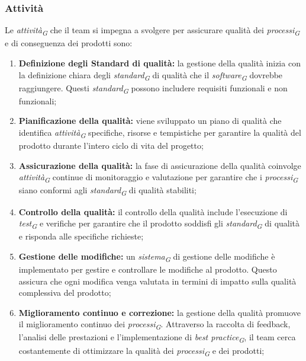 \subsubsection{Attività}
Le \textit{attività}\textsubscript{\textit{G}} che il team si impegna a svolgere per assicurare qualità dei \textit{processi}\textsubscript{\textit{G}} e di conseguenza dei prodotti sono:
\begin{enumerate}
    \item \textbf{Definizione degli Standard di qualità:}
        la gestione della qualità inizia con la definizione chiara degli \textit{standard}\textsubscript{\textit{G}} di qualità che il \textit{software}\textsubscript{\textit{G}} dovrebbe raggiungere. Questi \textit{standard}\textsubscript{\textit{G}} possono includere requisiti funzionali e non funzionali;

    \item \textbf{Pianificazione della qualità:}
        viene sviluppato un piano di qualità che identifica \textit{attività}\textsubscript{\textit{G}} specifiche, risorse e tempistiche per garantire la qualità del prodotto durante l'intero ciclo di vita del progetto;

    \item \textbf{Assicurazione della qualità:}
        la fase di assicurazione della qualità coinvolge \textit{attività}\textsubscript{\textit{G}} continue di monitoraggio e valutazione per garantire che i \textit{processi}\textsubscript{\textit{G}} siano conformi agli \textit{standard}\textsubscript{\textit{G}} di qualità stabiliti;

    \item \textbf{Controllo della qualità:}
        il controllo della qualità include l'esecuzione di \textit{test}\textsubscript{\textit{G}} e verifiche per garantire che il prodotto soddisfi gli \textit{standard}\textsubscript{\textit{G}} di qualità e risponda alle specifiche richieste;

    \item \textbf{Gestione delle modifiche:}
        un \textit{sistema}\textsubscript{\textit{G}} di gestione delle modifiche è implementato per gestire e controllare le modifiche al prodotto. Questo assicura che ogni modifica venga valutata in termini di impatto sulla qualità complessiva del prodotto;

    \item \textbf{Miglioramento continuo e correzione:}
        la gestione della qualità promuove il miglioramento continuo dei \textit{processi}\textsubscript{\textit{G}}. Attraverso la raccolta di feedback, l'analisi delle prestazioni e l'implementazione di \textit{best practice}\textsubscript{\textit{G}}, il team cerca costantemente di ottimizzare la qualità dei \textit{processi}\textsubscript{\textit{G}} e dei prodotti;


\end{enumerate}
